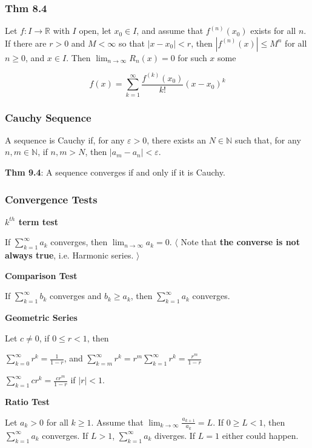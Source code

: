 \documentclass[12pt,letterpaper]{article}
\def\eps{\varepsilon{}}
\newcommand{\R}{{\mathbb R}}
\newcommand{\N}{{\mathbb N}}
\newcommand{\btw}[1]{
    $\langle$ #1 $\rangle$
}
\begin{document}
\begin{multicols*}{2}
        \subsubsection{Thm 8.4}

        Let $f: I \to \R$ with $I$ open, let $x_0 \in I$, and assume that
        $f^{(n)}(x_0)$ exists for all $n$. If there are $r > 0$ and $M < \infty$
        so that $|x - x_0| < r$, then $|f^{(n)}(x)| \le M^n$ for all $n \ge 0$,
        and $x \in I$. Then $\lim_{n \to \infty} R_n(x) = 0$ for such $x$ some

        \[
          f(x) = \sum_{k = 1}^{\infty} \frac{f^{(k)}(x_0)}{k!}(x - x_0)^k
        \]

        \subsubsection{Cauchy Sequence}

        A sequence is Cauchy if, for any $\eps > 0$, there exists an $N \in \N$
        such that, for any $n, m \in \N$, if $n, m > N$, then $|a_m - a_n| <
        \eps$.

        {\bf Thm 9.4}: A sequence converges if and only if it is Cauchy.

        \subsubsection{Convergence Tests}

        {\bf $k^{th}$ term test}

        If $\sum_{k = 1}^{\infty} a_k$ converges, then $\lim_{n \to \infty} a_k
        = 0$. \btw{Note that {\bf the converse is not always true}, i.e.
        Harmonic series.}


        {\bf Comparison Test}

        If $\sum_{k = 1}^{\infty} b_k$ converges and $b_k \ge a_k$, then
        $\sum_{k = 1}^{\infty} a_k$ converges.


        {\bf Geometric Series}

        Let $c \ne 0$, if $0 \le r < 1$, then

        $\sum_{k = 0}^{\infty} r^k = \frac{1}{1 - r}$, and $\sum_{k =
        m}^{\infty} r^k = r^m \sum_{k = 1}^{\infty} r^k = \frac{r^m}{1 - r}$


        $\sum_{k = 1}^{\infty} c r^k = \frac{cr^m}{1 - r}$ if $|r| < 1$.


        {\bf Ratio Test}

        Let $a_k > 0$ for all $k \ge 1$. Assume that $\lim_{k \to \infty}
        \frac{a_{k + 1}}{a_k} = L$. If $0 \ge L < 1$, then $\sum_{k =
        1}^{\infty} a_k$ converges. If $L > 1$, $\sum_{k = 1}^{\infty} a_k$
        diverges. If $L = 1$ either could happen.



\end{multicols*}
\end{document}
